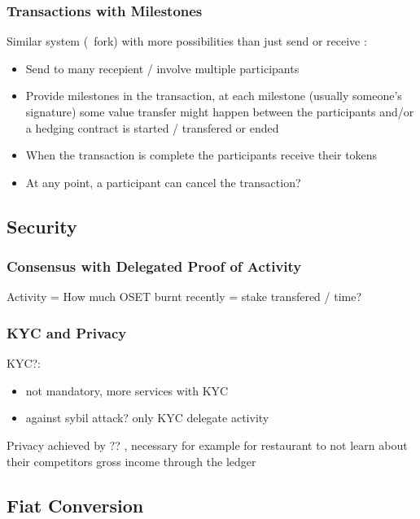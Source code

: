 \documentclass[a4paper]{article}
\begin{document}
\subsubsection{Transactions with Milestones}

Similar system (~fork) with more possibilities than just send or receive : 
\begin{itemize}
\item Send to many recepient / involve multiple participants
\item  Provide milestones in the transaction, at each milestone (usually someone's signature) some value transfer might happen between the participants and/or a hedging contract is started / transfered or ended
\item  When the transaction is complete the participants receive their tokens
\item  At any point, a participant can cancel the transaction?
\end{itemize}


\subsection{Security}

\subsubsection{Consensus with Delegated Proof of Activity}


Activity = How much OSET burnt recently = stake transfered / time?

\subsubsection{KYC and Privacy}

KYC?:
\begin{itemize}
\item not mandatory, more services with KYC
\item against sybil attack? only KYC delegate activity
\end{itemize}

Privacy achieved by ?? , necessary for example for restaurant to not learn about their competitors gross income through the ledger

\subsection{Fiat Conversion}
\end{document}
